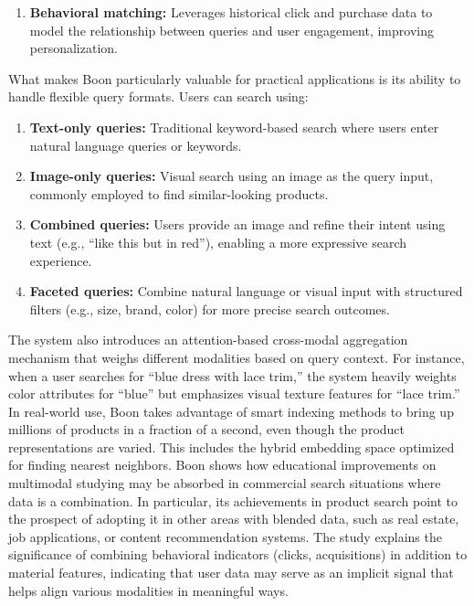 \documentclass[conference]{IEEEtran}
\begin{document}
\begin{enumerate}
\begin{enumerate}
    \item \textbf{Behavioral matching:} Leverages historical click and purchase data to model the relationship between queries and user engagement, improving personalization.
\end{enumerate}

What makes Boon particularly valuable for practical applications is its ability to handle flexible query formats. Users can search using:

\begin{enumerate}
    \item \textbf{Text-only queries:} Traditional keyword-based search where users enter natural language queries or keywords.
    
    \item \textbf{Image-only queries:} Visual search using an image as the query input, commonly employed to find similar-looking products.
    
    \item \textbf{Combined queries:} Users provide an image and refine their intent using text (e.g., “like this but in red”), enabling a more expressive search experience.
    
    \item \textbf{Faceted queries:} Combine natural language or visual input with structured filters (e.g., size, brand, color) for more precise search outcomes.
\end{enumerate}

The system also introduces an attention-based cross-modal aggregation mechanism that weighs different modalities based on query context. For instance, when a user searches for “blue dress with lace trim,” the system heavily weights color attributes for “blue” but emphasizes visual texture features for “lace trim.”
In real-world use, Boon takes advantage of smart indexing methods to bring up millions of products in a fraction of a second, even though the product representations are varied. This includes the hybrid embedding space optimized for finding nearest neighbors.
Boon shows how educational improvements on multimodal studying may be absorbed in commercial search situations where data is a combination. In particular, its achievements in product search point to the prospect of adopting it in other areas with blended data, such as real estate, job applications, or content recommendation systems.
The study explains the significance of combining behavioral indicators (clicks, acquisitions) in addition to material features, indicating that user data may serve as an implicit signal that helps align various modalities in meaningful ways.



\end{enumerate}
\end{document}
